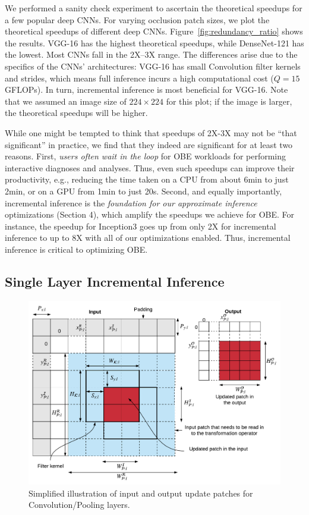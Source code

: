 We performed a sanity check experiment to ascertain the theoretical speedups for a few popular deep CNNs. For varying occlusion patch sizes, we plot the theoretical speedups of different deep CNNs. Figure~\ref{fig:redundancy_ratio} shows the results. VGG-16 has the highest theoretical speedups, while DenseNet-121 has the lowest. Most CNNs fall in the 2X--3X range. The differences arise due to the specifics of the CNNs' architectures: VGG-16 has small Convolution filter kernels and strides, which means full inference incurs a high computational cost ($Q = 15$ GFLOPs). In turn, incremental inference is most beneficial for VGG-16. Note that we assumed an image size of $224 \times 224$ for this plot; if the image is larger, the theoretical speedups will be higher.

While one might be tempted to think that speedups of 2X-3X may not be ``that significant'' in practice, we find that they indeed are significant for at least two reasons. First, \textit{users often wait in the loop} for OBE workloads for performing interactive diagnoses and analyses. Thus, even such speedups can improve their productivity, e.g., reducing the time taken on a CPU from about 6min to just 2min, or on a GPU from 1min to just 20s. Second, and equally importantly, incremental inference is the \textit{foundation for our approximate inference} optimizations (Section 4), which amplify the speedups we achieve for OBE. For instance, the speedup for Inception3 goes up from only 2X for incremental inference to up to 8X with all of our optimizations enabled. Thus, incremental inference is critical to optimizing OBE.

\subsection{Single Layer Incremental Inference}\label{sec:inc_computation}

\begin{figure}[t]
\includegraphics[width=\columnwidth]{images/dimensions}
\vspace{-8mm}
\caption{Simplified illustration of input and output update patches for Convolution/Pooling layers.}
\label{fig:dimensions}
\vspace{-8mm}
\end{figure}

